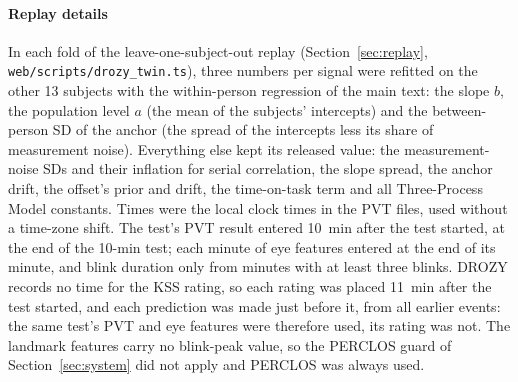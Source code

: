 \paragraph*{Replay details} In each fold of the leave-one-subject-out replay (Section~\ref{sec:replay}, \texttt{web/scripts/drozy\_twin.ts}), three numbers per signal were refitted on the other 13 subjects with the within-person regression of the main text: the slope $b$, the population level $a$ (the mean of the subjects' intercepts) and the between-person SD of the anchor (the spread of the intercepts less its share of measurement noise). Everything else kept its released value: the measurement-noise SDs and their inflation for serial correlation, the slope spread, the anchor drift, the offset's prior and drift, the time-on-task term and all Three-Process Model constants. Times were the local clock times in the PVT files, used without a time-zone shift. The test's PVT result entered 10~min after the test started, at the end of the 10-min test; each minute of eye features entered at the end of its minute, and blink duration only from minutes with at least three blinks. DROZY records no time for the KSS rating, so each rating was placed 11~min after the test started, and each prediction was made just before it, from all earlier events: the same test's PVT and eye features were therefore used, its rating was not. The landmark features carry no blink-peak value, so the PERCLOS guard of Section~\ref{sec:system} did not apply and PERCLOS was always used.

